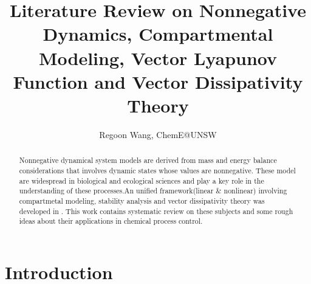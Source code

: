 \documentclass{paper}
\begin{document}
 
\title{Literature Review on Nonnegative Dynamics, Compartmental Modeling, Vector Lyapunov Function
and Vector Dissipativity Theory}
\author{Regoon Wang, ChemE@UNSW} 


\maketitle
\begin{abstract}
Nonnegative dynamical system models are derived from mass and energy balance considerations that
involves dynamic states whose values are nonnegative. These model are widespread in biological
and ecological sciences and play a key role in the understanding of these processes.An unified
framework(linear \& nonlinear) involving compartmetal modeling, stability analysis and vector 
dissipativity theory was developed in \cite{bern_comp,hadd_non,hadd_thermo_1,hadd_thermo_2}. 
This work contains systematic review on these subjects and some rough ideas about their applications
in chemical process control.
\end{abstract} 

\tableofcontents
\section{Introduction}
\end{document}
